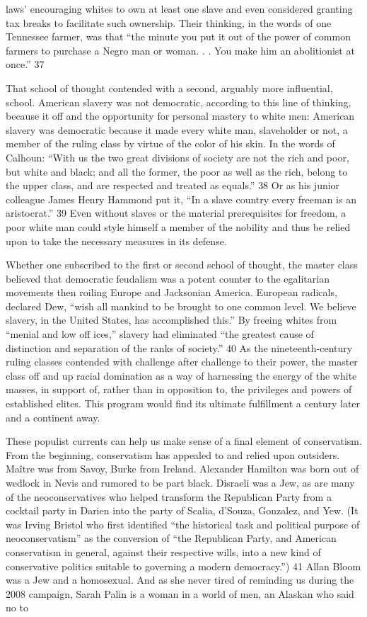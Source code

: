 laws' encouraging whites to own at least one slave and even considered granting tax breaks to facilitate such ownership. Their thinking, in the words of one Tennessee farmer, was that “the minute you put it out of the power of common farmers to purchase a Negro man or woman. . . You make him an abolitionist at once.” {\color{blue} 37 } {\par} That school of thought contended with a second, arguably more influential, school. American slavery was not democratic, according to this line of thinking, because it off and the opportunity for personal mastery to white men: American slavery was democratic because it made every white man, slaveholder or not, a member of the ruling class by virtue of the color of his skin. In the words of Calhoun: “With us the two great divisions of society are not the rich and poor, but white and black; and all the former, the poor as well as the rich, belong to the upper class, and are respected and treated as equals.” {\color{blue} 38 } Or as his junior colleague James Henry Hammond put it, “In a slave country every freeman is an aristocrat.” {\color{blue} 39 } Even without slaves or the material prerequisites for freedom, a poor white man could style himself a member of the nobility and thus be relied upon to take the necessary measures in its defense.{\par} Whether one subscribed to the first or second school of thought, the master class believed that democratic feudalism was a potent counter to the egalitarian movements then roiling Europe and Jacksonian America. European radicals, declared Dew, “wish all mankind to be brought to one common level. We believe slavery, in the United States, has accomplished this.” By freeing whites from “menial and low off ices,” slavery had eliminated “the greatest cause of distinction and separation of the ranks of society.” {\color{blue} 40 } As the nineteenth-century ruling classes contended with challenge after challenge to their power, the master class off and up racial domination as a way of harnessing the energy of the white masses, in support of, rather than in opposition to, the privileges and powers of established elites. This program would find its ultimate fulfillment a century later and a continent away.{\par} These populist currents can help us make sense of a final element of conservatism. From the beginning, conservatism has appealed to and relied upon outsiders. Maître was from Savoy, Burke from Ireland. Alexander Hamilton was born out of wedlock in Nevis and rumored to be part black. Disraeli was a Jew, as are many of the neoconservatives who helped transform the Republican Party from a cocktail party in Darien into the party of Scalia, d’Souza, Gonzalez, and Yew. (It was Irving Bristol who first identified “the historical task and political purpose of neoconservatism” as the conversion of “the Republican Party, and American conservatism in general, against their respective wills, into a new kind of conservative politics suitable to governing a modern democracy.”) {\color{blue} 41 } Allan Bloom was a Jew and a homosexual. And as she never tired of reminding us during the 2008 campaign, Sarah Palin is a woman in a world of men, an Alaskan who said no to 
